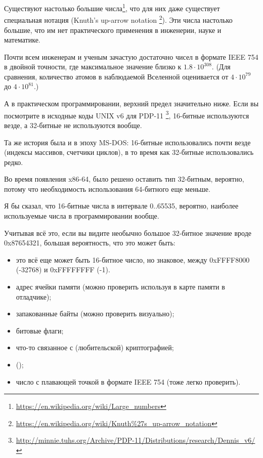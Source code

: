 Существуют настолько большие числа\footnote{\url{https://en.wikipedia.org/wiki/Large_numbers}},
что для них даже существует специальная нотация (Knuth's up-arrow notation
\footnote{\url{https://en.wikipedia.org/wiki/Knuth\%27s_up-arrow_notation}}).
Эти числа настолько большие, что им нет практического применения в инженерии, науке и математике.

Почти всем инженерам и ученым зачастую достаточно чисел в формате IEEE 754 в двойной точности,
где максимальное значение близко к $1.8 \cdot 10^{308}$.
(Для сравнения, количество атомов в наблюдаемой Вселенной оценивается от $4 \cdot 10^{79}$ до $4 \cdot 10^{81}$.)

А в практическом программировании, верхний предел значительно ниже.
Если вы посмотрите в исходные коды UNIX v6 для PDP-11
\footnote{\url{http://minnie.tuhs.org/Archive/PDP-11/Distributions/research/Dennis_v6/}},
16-битные  используются везде, а 32-битные  не используются вообще.

Та же история была и в эпоху MS-DOS: 16-битные  использовались почти везде (индексы массивов, счетчики циклов),
в то время как 32-битные  использовались редко.

Во время появления x86-64, было решено оставить тип  32-битным, вероятно, потому что 
необходимость использования 64-битного  еще меньше.

Я бы сказал, что 16-битные числа в интервале 0..65535, вероятно, наиболее используемые числа в программировании вообще.

Учитывая всё это, если вы видите необычно большое 32-битное значение вроде 0x87654321, большая вероятность,
что это может быть:

\begin{itemize}

\item это всё еще может быть 16-битное число, но знаковое, между 0xFFFF8000 (-32768) и 0xFFFFFFFF (-1).
\item адрес ячейки памяти (можно проверить используя в карте памяти в отладчике);
\item запакованные байты (можно проверить визуально);
\item битовые флаги;
\item что-то связанное с (любительской) криптографией;
\item {} ();
\item число с плавающей точкой в формате IEEE 754 (тоже легко проверить).

\end{itemize}

